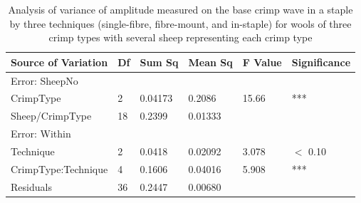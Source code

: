 %

\begin{table}[htp]
\centering
\caption{Analysis of variance of amplitude measured on the base crimp wave in a staple by three techniques (single-fibre, fibre-mount, and in-staple) for wools of three crimp types with several sheep representing each crimp type}
\label{tab:fwamplaov}
\vspace{0.1in}
\begin{tabular}{|p{1.3in}|p{0.4in}|p{0.4in}|p{0.4in}|p{0.4in}|p{0.8in}|} \hline
     Source of Variation & Df & Sum Sq  & Mean Sq  & F Value  & Significance  \\  \hline
 Error: SheepNo & & & & & \\
 CrimpType & 2 & 0.04173 & 0.2086 & 15.66 & ***  \\
 Sheep/CrimpType & 18 & 0.2399 & 0.01333 &  &   \\ 
 Error: Within & & & & & \\
 Technique & 2 & 0.0418 & 0.02092 & 3.078  & $<$ 0.10  \\
 CrimpType:Technique & 4 & 0.1606 & 0.04016 & 5.908 & *** \\
 Residuals & 36 & 0.2447 & 0.00680 & & \\ \hline
\end{tabular}
\end{table}

%
